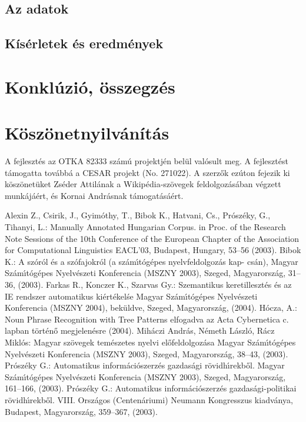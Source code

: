 \documentclass{llncs}
\begin{document}
\subsection{Az adatok}

\subsection{Kísérletek és eredmények}

\section{Konklúzió, összegzés}

\section*{Köszönetnyilvánítás}
A fejlesztés az OTKA 82333 számú projektjén belül valósult meg. A fejlesztést támogatta továbbá a CESAR projekt (No. 271022). A szerzők ezúton fejezik ki köszönetüket Zséder Attilának a Wikipédia-szövegek feldolgozásában végzett munkájáért, és Kornai Andrásnak támogatásáért. %

%
%
\begin{thebibliography}{15}
%
Alexin Z., Csirik, J., Gyim\'othy, T., Bibok K., Hatvani, Cs.,
Pr\'osz\'eky, G., Tihanyi, L.:
Manually Annotated Hungarian Corpus.
in Proc. of the Research Note Sessions of the 10th Conference
of the European Chapter of the Association for Computational
Linguistics EACL'03, Budapest, Hungary, 53--56 (2003).
%
Bibok K.:
A sz\'or\'ol \'es a sz\'ofajokr\'ol (a sz\'am\'\i t\'og\'epes nyelvfeldolgoz\'as kap- cs\'an),
Magyar Sz\'am\'\i t\'og\'epes Nyelv\'eszeti Konferencia (MSZNY 2003),
Szeged, Magyarorsz\'ag, 31--36, (2003).
%
Farkas R., Konczer K., Szarvas Gy.:
Szemantikus keretilleszt\'es \'es az IE rendszer automatikus ki\'ert\'ekel\'se
Magyar Sz\'am\'\i t\'og\'epes Nyelv\'eszeti Konferencia (MSZNY 2004),
bek\"uldve, Szeged, Magyarorsz\'ag, (2004).
%
H\'ocza, A.:
Noun Phrase Recognition with Tree Patterns
elfogadva az Acta Cybernetica c. lapban t\"ort\'en\H{o} megjelen\'esre (2004).
%
Mih\'aczi Andr\'as, N\'emeth L\'aszl\'o, R\'acz Mikl\'os:
Magyar sz\"ovegek tem\'eszetes nyelvi el\H{o}feldolgoz\'asa
Magyar Sz\'am\'\i t\'og\'epes Nyelv\'eszeti Konferencia (MSZNY 2003),
Szeged, Magyarorsz\'ag, 38--43, (2003).
%
Pr\'osz\'eky G.:
Automatikus inform\'aci\'oszerz\'es gazdas\'agi r\"ovidh\'\i rekb\H{o}l.
Magyar Sz\'am\'\i t\'og\'epes Nyelv\'eszeti Konferencia (MSZNY 2003),
Szeged, Magyarorsz\'ag, 161--166, (2003).
%
Pr\'osz\'eky G.:
Automatikus inform\'aci\'oszerz\'es gazdas\'agi-politikai r\"ovidh\'\i rekb\H{o}l.
VIII. Orsz\'agos (Centen\'ariumi) Neumann Kongresszus kiadv\'anya,
Budapest, Magyarorsz\'ag, 359--367, (2003).
%
\end{thebibliography}
\end{document}
